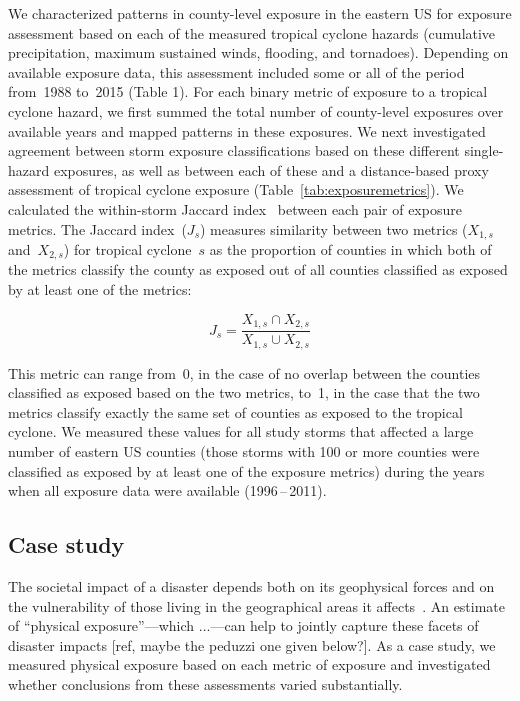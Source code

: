 We characterized patterns in county-level exposure in the eastern \ac{US} for
exposure assessment based on each of the measured tropical cyclone hazards
(cumulative precipitation, maximum sustained winds, flooding, and tornadoes).
Depending on available exposure data, this assessment included some or all of
the period from~1988 to~2015 (Table 1). For each binary metric of exposure to a
tropical cyclone hazard, we first summed the total number of county-level
exposures over available years and mapped patterns in
these exposures. We next investigated agreement between storm exposure
classifications based on these different single-hazard exposures, as well as
between each of these and a distance-based proxy assessment of tropical cyclone
exposure (Table~\ref{tab:exposuremetrics}). We calculated the within-storm
Jaccard index~\parencite{jaccard1901distribution, jaccard1908nouvelles} between
each pair of exposure metrics. The Jaccard index~($J_s$) measures similarity
between two metrics ($X_{1,s}$ and~$X_{2,s}$) for tropical cyclone~$s$ as the
proportion of counties in which both of the metrics classify the county as
exposed out of all counties classified as exposed by at least one of the
metrics:

\begin{equation} 
J_s = \frac{X_{1,s} \cap X_{2,s}}{X_{1,s} \cup X_{2,s}}
\end{equation}

\noindent This metric can range from~0, in the case of no overlap between the
counties classified as exposed based on the two metrics, to~1, in the case that
the two metrics classify exactly the same set of counties as exposed to the
tropical cyclone. We measured these values for all study storms that affected a
large number of eastern \ac{US} counties (those storms with 100 or more
counties were classified as exposed by at least one of the exposure metrics)
during the years when all exposure data were available (1996\,--\,2011).

\subsection*{Case study}

The societal impact of a disaster depends both on its geophysical forces and on
the vulnerability of those living in the geographical areas it
affects~\parencite{chakraborty2005population, anderson2003community,
cutter1996vulnerability}. An estimate of ``physical exposure''---which
...---can help to jointly capture these facets of disaster impacts [ref, maybe
the peduzzi one given below?]. As a case study, we measured physical exposure
based on each metric of exposure and investigated whether conclusions from
these assessments varied substantially.


